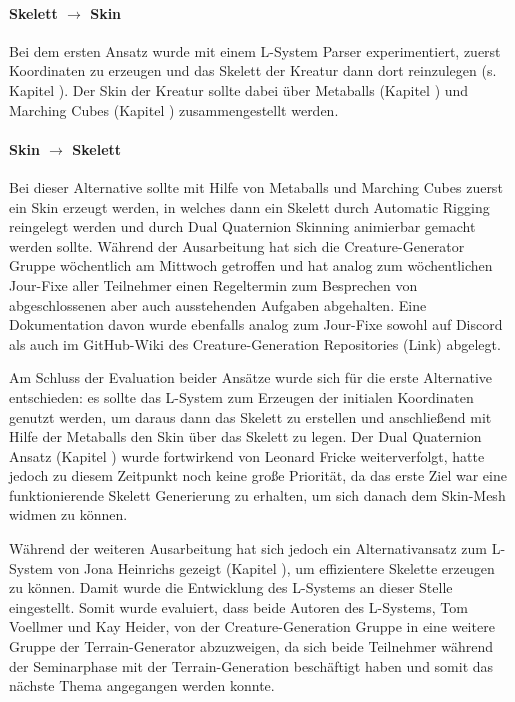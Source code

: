 \paragraph{Skelett $\rightarrow$ Skin} Bei dem ersten Ansatz wurde mit einem L-System Parser experimentiert, zuerst Koordinaten zu erzeugen und das Skelett der Kreatur dann dort reinzulegen (s. Kapitel ). Der Skin der Kreatur sollte dabei über Metaballs (Kapitel ) und Marching Cubes (Kapitel ) zusammengestellt werden.

\paragraph{Skin $\rightarrow$ Skelett} Bei dieser Alternative sollte mit Hilfe von Metaballs und Marching Cubes zuerst ein Skin erzeugt werden, in welches dann ein Skelett durch Automatic Rigging reingelegt werden und durch Dual Quaternion Skinning animierbar gemacht werden sollte.
\newline \newline
Während der Ausarbeitung hat sich die Creature-Generator Gruppe wöchentlich am Mittwoch getroffen und hat analog zum wöchentlichen Jour-Fixe aller Teilnehmer einen Regeltermin zum Besprechen von abgeschlossenen aber auch ausstehenden Aufgaben abgehalten. Eine Dokumentation davon wurde ebenfalls analog zum Jour-Fixe sowohl auf Discord als auch im GitHub-Wiki des Creature-Generation Repositories (Link) abgelegt.

Am Schluss der Evaluation beider Ansätze wurde sich für die erste Alternative entschieden: es sollte das L-System zum Erzeugen der initialen Koordinaten genutzt werden, um daraus dann das Skelett zu erstellen und anschließend mit Hilfe der Metaballs den Skin über das Skelett zu legen. Der Dual Quaternion Ansatz (Kapitel ) wurde fortwirkend von Leonard Fricke weiterverfolgt, hatte jedoch zu diesem Zeitpunkt noch keine große Priorität, da das erste Ziel war eine funktionierende Skelett Generierung zu erhalten, um sich danach dem Skin-Mesh widmen zu können.  

Während der weiteren Ausarbeitung hat sich jedoch ein Alternativansatz zum L-System von Jona Heinrichs gezeigt (Kapitel ), um effizientere Skelette erzeugen zu können. Damit wurde die Entwicklung des L-Systems an dieser Stelle eingestellt. Somit wurde evaluiert, dass beide Autoren des L-Systems, Tom Voellmer und Kay Heider, von der Creature-Generation Gruppe in eine weitere Gruppe der Terrain-Generator abzuzweigen, da sich beide Teilnehmer während der Seminarphase mit der Terrain-Generation beschäftigt haben und somit das nächste Thema angegangen werden konnte.

